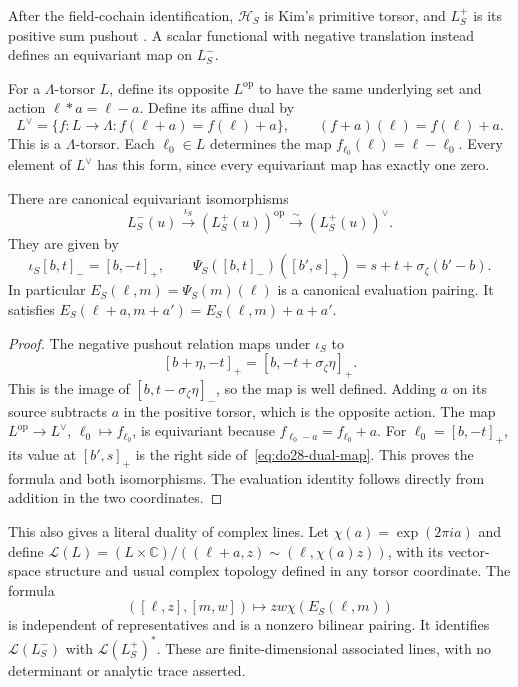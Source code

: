After the field-cochain identification, \(\mathcal H_S\) is Kim's
primitive torsor, and \(L_S^+\) is its positive sum pushout
\cite[\S2, p.~5, the definitions of \(H(\rho_S)\) and
\(L(\rho_S)\)]{Kim2016}. A scalar functional with negative translation
instead defines an equivariant map on \(L_S^-\).

For a \(\Lambda\)-torsor \(L\), define its opposite \(L^{\mathrm{op}}\)
to have the same underlying set and action \(\ell*a=\ell-a\).
Define its affine dual by
\[
 L^\vee=\{f:L\to\Lambda:f(\ell+a)=f(\ell)+a\},
 \qquad(f+a)(\ell)=f(\ell)+a.
\]
This is a \(\Lambda\)-torsor. Each \(\ell_0\in L\) determines the
map \(f_{\ell_0}(\ell)=\ell-\ell_0\). Every element of \(L^\vee\)
has this form, since every equivariant map has exactly one zero.

\begin{proposition}
\label{prop:do28-dual}
There are canonical equivariant isomorphisms
\[
 L_S^-(u)\xrightarrow{\iota_S}(L_S^+(u))^{\mathrm{op}}
       \xrightarrow{\sim}(L_S^+(u))^\vee.
\]
They are given by
\begin{equation}
\label{eq:do28-dual-map}
 \iota_S[b,t]_-=[b,-t]_+,
 \qquad
 \Psi_S([b,t]_-)([b',s]_+)
       =s+t+\sigma_\zeta(b'-b).
\end{equation}
In particular
\(E_S(\ell,m)=\Psi_S(m)(\ell)\) is a canonical evaluation pairing.
It satisfies
\(E_S(\ell+a,m+a')=E_S(\ell,m)+a+a'\).
\end{proposition}

\begin{proof}
The negative pushout relation maps under \(\iota_S\) to
\[
 [b+\eta,-t]_+=[b,-t+\sigma_\zeta\eta]_+.
\]
This is the image of \([b,t-\sigma_\zeta\eta]_-\), so the map
is well defined. Adding \(a\) on its source subtracts \(a\) in the
positive torsor, which is the opposite action.
The map \(L^{\mathrm{op}}\to L^\vee\), \(\ell_0\mapsto f_{\ell_0}\),
is equivariant because \(f_{\ell_0-a}=f_{\ell_0}+a\).
For \(\ell_0=[b,-t]_+\), its value at \([b',s]_+\) is the
right side of~\eqref{eq:do28-dual-map}.
This proves the formula and both isomorphisms. The evaluation identity
follows directly from addition in the two coordinates.
\end{proof}

This also gives a literal duality of complex lines. Let
\(\chi(a)=\exp(2\pi ia)\) and define
\(\mathcal L(L)=(L\times\mathbb C)/((\ell+a,z)\sim(\ell,\chi(a)z))\),
with its vector-space structure and usual complex topology defined in
any torsor coordinate.
The formula
\[
 ([\ell,z],[m,w])\longmapsto zw\chi(E_S(\ell,m))
\]
is independent of representatives and is a nonzero bilinear pairing.
It identifies \(\mathcal L(L_S^-)\) with
\(\mathcal L(L_S^+)^*\). These are finite-dimensional associated
lines, with no determinant or analytic trace asserted.


